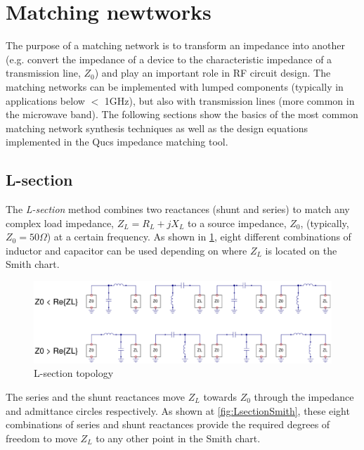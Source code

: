 \section{Matching newtworks}
The purpose of a matching network is to transform an impedance into another (e.g. convert the impedance of a device to the characteristic impedance of a transmission line, $Z_0$) and play an important role in RF circuit design. The matching networks can be implemented with lumped components (typically in applications below $<$ 1GHz), but also with transmission lines (more common in the microwave band). The following sections show the basics of the most common matching network synthesis techniques as well as the design equations implemented in the Qucs impedance matching tool.

\subsection{L-section}
The \textit{L-section} method combines two reactances (shunt and series) to match any complex load impedance, $Z_L = R_L + jX_L$ to a source impedance, $Z_0$, (typically, $Z_0 = 50\Omega$) at a certain frequency. As shown in \ref{fig:Lsection}, eight different combinations of inductor and capacitor can be used depending on where $Z_L$ is located on the Smith chart.

\begin{figure}[H]
\centering
\includegraphics[width=120mm]{Lsection}
\caption{L-section topology}
\label{fig:Lsection}
\end{figure}

The series and the shunt reactances move $Z_L$ towards $Z_0$ through the impedance and admittance circles respectively. As shown at \ref{fig:LsectionSmith}, these eight combinations of series and shunt reactances provide the required degrees of freedom to move $Z_L$ to any other point in the Smith chart.


